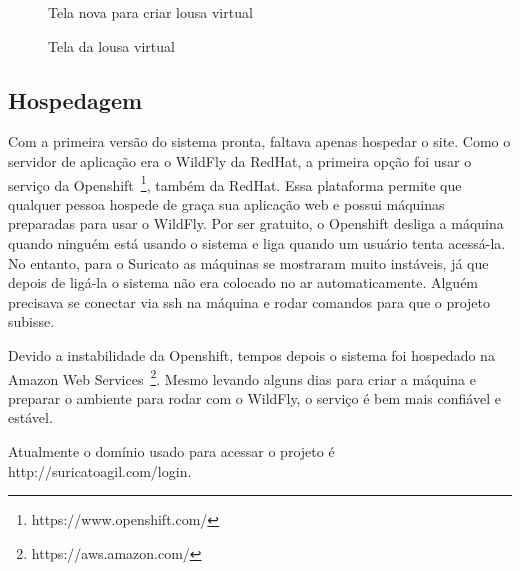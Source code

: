 \begin{figure}[H]
  \centering
  \caption{Tela nova para criar lousa virtual}\label{figura:criarNovo}
\end{figure}

\begin{figure}[H]
  \centering
  \caption{Tela da lousa virtual}\label{figura:Retrospectiva}
\end{figure}
\subsection{Hospedagem}

Com a primeira versão do sistema pronta, faltava apenas hospedar o site. Como o servidor de aplicação era o WildFly da RedHat, a primeira opção foi usar o serviço da Openshift~\footnote{https://www.openshift.com/}, também da RedHat. Essa plataforma permite que qualquer pessoa hospede de graça sua aplicação web e possui máquinas preparadas para usar o WildFly. Por ser gratuito, o Openshift desliga a máquina quando ninguém está usando o sistema e liga quando um usuário tenta acessá-la. No entanto, para o Suricato as máquinas se mostraram muito instáveis, já que depois de ligá-la o sistema não era colocado no ar automaticamente. Alguém precisava se conectar via ssh na máquina e rodar comandos para que o projeto subisse.

Devido a instabilidade da Openshift, tempos depois o sistema foi hospedado na Amazon Web Services~\footnote{https://aws.amazon.com/}. Mesmo levando alguns dias para criar a máquina e preparar o ambiente para rodar com o WildFly, o serviço é bem mais confiável e estável.

Atualmente o domínio usado para acessar o projeto é http://suricatoagil.com/login.